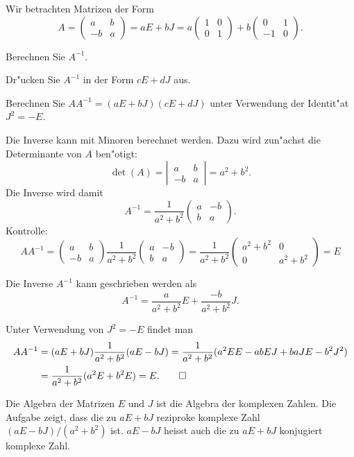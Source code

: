 Wir betrachten Matrizen der Form
\[
A=\begin{pmatrix}a&b\\-b&a\end{pmatrix}
=aE+bJ=a\begin{pmatrix}1&0\\0&1\end{pmatrix}+b\begin{pmatrix}0&1\\-1&0\end{pmatrix}.
\]
\begin{teilaufgaben}
\item
Berechnen Sie $A^{-1}$.
\item
Dr"ucken Sie $A^{-1}$ in der Form $cE+dJ$ aus.
\item
Berechnen Sie $AA^{-1}=(aE+bJ)(cE+dJ)$ unter Verwendung der Identit"at
$J^2=-E$.
\end{teilaufgaben}

\begin{loesung}
\begin{teilaufgaben}
\item
Die Inverse kann mit Minoren berechnet werden.
Dazu wird zun"achst die Determinante von $A$ ben"otigt:
\[
\det(A)=\left|\,\begin{matrix}a&b\\-b&a\end{matrix}\,\right|=a^2+b^2.
\]
Die Inverse wird damit
\[
A^{-1}=\frac1{a^2+b^2}\begin{pmatrix}a&-b\\b&a\end{pmatrix}.
\]
Kontrolle:
\[
AA^{-1}
=
\begin{pmatrix}a&b\\-b&a\end{pmatrix}
\frac{1}{a^2+b^2}
\begin{pmatrix}a&-b\\b&a\end{pmatrix}
=
\frac{1}{a^2+b^2}
\begin{pmatrix}a^2+b^2&0\\0&a^2+b^2 \end{pmatrix}=E
\]
\item
Die Inverse $A^{-1}$ kann geschrieben werden als
\[
A^{-1}
=
\frac{a}{a^2+b^2}E
+
\frac{-b}{a^2+b^2}J.
\]
\item Unter Verwendung von $J^2=-E$ findet man
\begin{align*}
AA^{-1}&=(aE+bJ)\frac1{a^2+b^2}(aE-bJ)
=\frac1{a^2+b^2}(a^2EE-abEJ+baJE-b^2J^2)
\\
&=\frac1{a^2+b^2}(a^2E+b^2E)=E.
\qedhere
\end{align*}
\end{teilaufgaben}
\end{loesung}

\begin{diskussion}
Die Algebra der Matrizen $E$ und $J$ ist die Algebra der komplexen Zahlen.
Die Aufgabe zeigt, dass die zu $aE+bJ$ reziproke komplexe Zahl
$(aE-bJ)/(a^2+b^2)$ ist.
$aE-bJ$ heisst auch die zu $aE+bJ$ konjugiert komplexe Zahl.
\end{diskussion}

